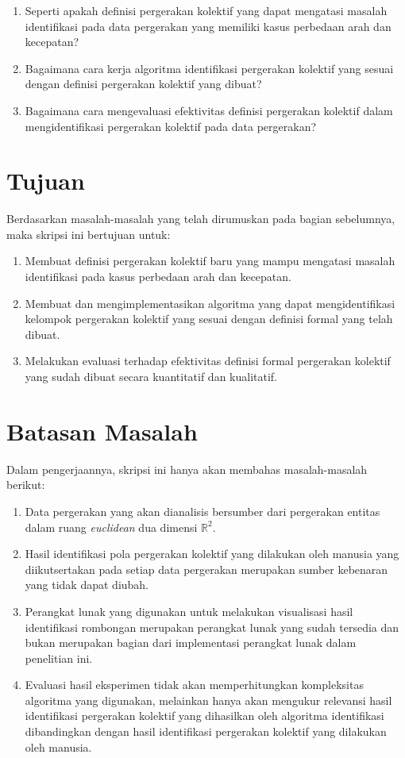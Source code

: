 \fi
\begin{enumerate}
    \item Seperti apakah definisi pergerakan kolektif yang dapat mengatasi masalah identifikasi pada data pergerakan yang memiliki kasus perbedaan arah dan kecepatan? 
    \item Bagaimana cara kerja algoritma identifikasi pergerakan kolektif yang sesuai dengan definisi pergerakan kolektif yang dibuat?  
    \item Bagaimana cara mengevaluasi efektivitas definisi pergerakan kolektif dalam mengidentifikasi pergerakan kolektif pada data pergerakan?
\end{enumerate}

\section{Tujuan}
\label{sec:tujuan}  

Berdasarkan masalah-masalah yang telah dirumuskan pada bagian sebelumnya, maka skripsi ini bertujuan untuk:

\begin{enumerate}
    \item Membuat definisi pergerakan kolektif baru yang mampu mengatasi masalah identifikasi pada kasus perbedaan arah dan kecepatan.
    \item Membuat dan mengimplementasikan algoritma yang dapat mengidentifikasi kelompok pergerakan kolektif yang sesuai dengan definisi formal yang telah dibuat.
    \item Melakukan evaluasi terhadap efektivitas definisi formal pergerakan kolektif yang sudah dibuat secara kuantitatif dan kualitatif.
\end{enumerate}

\section{Batasan Masalah}
\label{sec:batasan}

Dalam pengerjaannya, skripsi ini hanya akan membahas masalah-masalah berikut:

\begin{enumerate}
    \item Data pergerakan yang akan dianalisis bersumber dari pergerakan entitas dalam ruang \textit{euclidean} dua dimensi $\mathbb{R}^2$.
    \item Hasil identifikasi pola pergerakan kolektif yang dilakukan oleh manusia yang diikutsertakan pada setiap data pergerakan merupakan sumber kebenaran yang tidak dapat diubah.
    \item Perangkat lunak yang digunakan untuk melakukan visualisasi hasil identifikasi rombongan merupakan perangkat lunak yang sudah tersedia dan bukan merupakan bagian dari implementasi perangkat lunak dalam penelitian ini.
    \item Evaluasi hasil eksperimen tidak akan memperhitungkan kompleksitas algoritma yang digunakan, melainkan hanya akan mengukur relevansi hasil identifikasi pergerakan kolektif yang dihasilkan oleh algoritma identifikasi dibandingkan dengan hasil identifikasi pergerakan kolektif yang dilakukan oleh manusia.
\end{enumerate}

